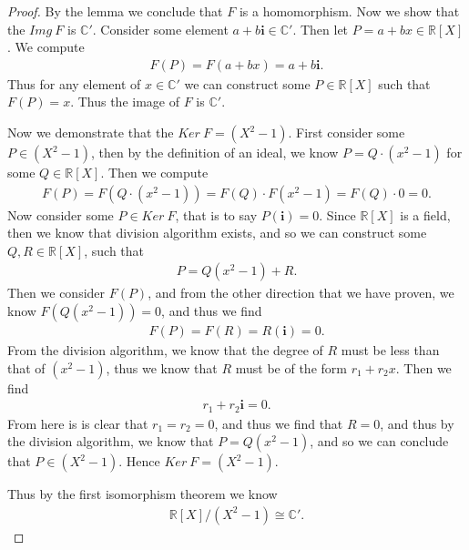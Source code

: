 \documentclass[10pt]{armath}
\newcommand{\R}{\mathbb{R}}
\newcommand{\C}{\mathbb{C}}
\newcommand{\ra}{\rightarrow}
\newenvironment{claim}[1]{\par\noindent\textit{Claim:}\space#1}{}
\begin{document}
\begin{proof}
  By the lemma we conclude that $F$ is a homomorphism.
  Now we show that the $Img\ F$ is $\C'$. Consider some element
  $a+b\mathbf{i}\in\C'$. Then let $P=a+bx\in\R[X]$. We compute
  \begin{align*}
    F(P)=F(a+bx)=a+b\mathbf{i}.
  \end{align*}
  Thus for any element of $x\in\C'$ we can construct some $P\in\R[X]$ such that
  $F(P)=x$. Thus the image of $F$ is $\C'$.

  Now we demonstrate that the $Ker\ F=(X^2-1)$. First consider some
  $P\in\left(X^2-1\right)$, then by the definition of an ideal, we know
  $P=Q\cdot(x^2-1)$ for some $Q\in\R[X]$. Then we compute
  \begin{align*}
    F(P)=F(Q\cdot(x^2-1))=F(Q)\cdot F(x^2-1)=F(Q)\cdot 0=0.
  \end{align*}
  Now consider some $P\in Ker\ F$, that is to say $P(\mathbf{i})=0$. Since
  $\R[X]$ is a field, then we know that division algorithm exists, and so we
  can construct some $Q,R\in\R[X]$, such that
  \begin{align*}
     P=Q(x^2-1)+R.
  \end{align*}
  Then we consider $F(P)$, and from the other direction that we have proven, we
  know $F(Q(x^2-1))=0$, and thus we find
  \begin{align*}
     F(P)=F(R)=R(\mathbf{i})=0.
  \end{align*}
  From the division algorithm, we know that the degree of $R$ must be less than
  that of $(x^2-1)$, thus we know that $R$ must be of the form $r_1+r_2x$. Then
  we find
  \begin{align*}
     r_1+r_2\mathbf{i}=0.
  \end{align*}
  From here is is clear that $r_1=r_2=0$, and thus we find that
  $R=0$, and thus by the division algorithm, we know that $P=Q(x^2-1)$, and so
  we can conclude that $P\in\left(X^2-1\right)$. Hence $Ker\
  F=\left(X^2-1\right)$.

  Thus by the first isomorphism theorem we know
  \begin{align*}
    \R[X]/(X^2-1)\cong\C'.
  \end{align*}
\end{proof}
\end{document}
